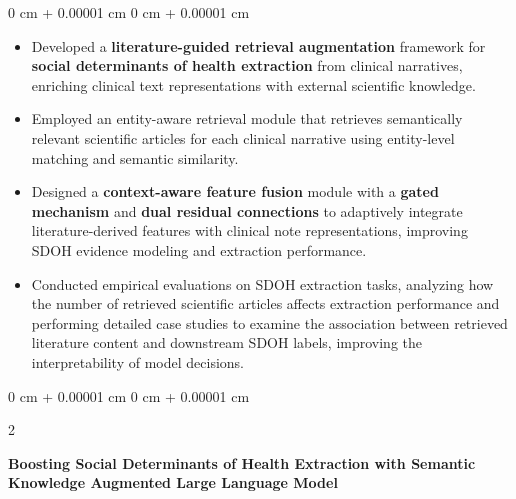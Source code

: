 \documentclass[10pt, letterpaper]{article}
\newenvironment{highlights}{
    \begin{itemize}[
        topsep=0.10 cm,
        parsep=0.10 cm,
        partopsep=0pt,
        itemsep=0pt,
        leftmargin=0 cm + 10pt
    ]
}{
    \end{itemize}
} %
\newenvironment{onecolentry}{
    \begin{adjustwidth}{
        0 cm + 0.00001 cm
    }{
        0 cm + 0.00001 cm
    }
}{
    \end{adjustwidth}
} %
\newenvironment{twocolentry}[2][]{
    \onecolentry
    \def\secondColumn{#2}
    \setcolumnwidth{\fill, 4.5 cm}
    \begin{paracol}{2}
}{
    \switchcolumn \raggedleft \secondColumn
    \end{paracol}
    \endonecolentry
} %
\begin{document}
\vspace{0.05 cm}
\begin{onecolentry}
    \begin{highlights}
        \item Developed a \textbf{literature-guided retrieval augmentation} framework for \textbf{social determinants of health extraction} from clinical narratives, enriching clinical text representations with external scientific knowledge.

        \item Employed an entity-aware retrieval module that retrieves semantically relevant scientific articles for each clinical narrative using entity-level matching and semantic similarity.

        \item Designed a \textbf{context-aware feature fusion} module with a \textbf{gated mechanism} and \textbf{dual residual connections} to adaptively integrate literature-derived features with clinical note representations, improving SDOH evidence modeling and extraction performance.


        \item Conducted empirical evaluations on SDOH extraction tasks, analyzing how the number of retrieved scientific articles affects extraction performance and performing detailed case studies to examine the association between retrieved literature content and downstream SDOH labels, improving the interpretability of model decisions.

    \end{highlights}
\end{onecolentry}


\begin{twocolentry}{
    2024
}
    \textbf{Boosting Social Determinants of Health Extraction with Semantic Knowledge Augmented Large Language Model}
\end{twocolentry}
\end{document}
